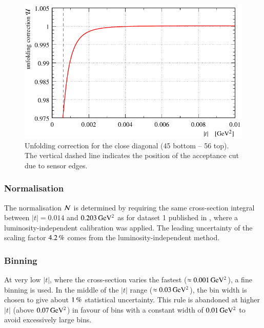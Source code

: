 \begin{figure}
\begin{center}
\includegraphics{fig/unfolding.pdf}
\caption{%
Unfolding correction for the close diagonal (45 bottom -- 56 top). The vertical dashed line indicates the position of the acceptance cut due to sensor edges.
}
\label{fig:unfolding}
\end{center}
\end{figure}


\subsubsection{Normalisation}
\label{sec:normalisation}

The normalisation ${\cal N}$ is determined by requiring the same cross-section integral between $|t| = 0.014$ and $0.203\,{\rm GeV^2}$ as for dataset 1 published in \cite{prl111}, where a luminosity-independent calibration was applied. The leading uncertainty of the scaling factor $4.2\,{\rm \%}$ comes from the luminosity-independent method.



\subsubsection{Binning}
\label{sec:binning}

At very low $|t|$, where the cross-section varies the fastest ($\approx 0.001\,{\rm GeV^2}$), a fine binning is used. In the middle of the $|t|$ range ($\approx 0.03\,{\rm GeV^2}$), the bin width is chosen to give about $1\,{\rm \%}$ statistical uncertainty. This rule is abandoned at higher $|t|$ (above $0.07\,{\rm GeV^2}$) in favour of bins with a constant width of $0.01\,{\rm GeV^2}$ to avoid excessively large bins.


